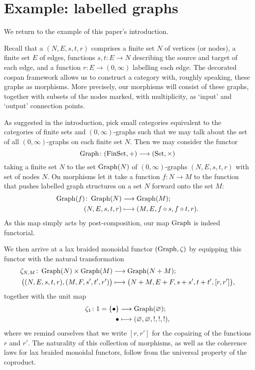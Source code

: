 \section{Example: labelled graphs} \label{sec:ex}

We return to the example of this paper's introduction. 

Recall that a  $(N,E,s,t,r)$ comprises a finite set
$N$ of vertices (or nodes), a finite set $E$ of edges, functions $s,t\colon  E \to N$
describing the source and target of each edge, and a function $r\colon  E \to
(0,\infty)$ labelling each edge. The decorated cospan framework allows us to
construct a category with, roughly speaking, these graphs as morphisms. More
precisely, our morphisms will consist of these graphs, together with subsets of
the nodes marked, with multiplicity, as `input' and `output' connection points.

As suggested in the introduction, pick small categories equivalent to the
categories of finite sets and $(0,\infty)$-graphs such that we may talk about
the set of all $(0,\infty)$-graphs on each finite set $N$.  Then we may consider
the functor
\[
  \operatorname{Graph}\colon  (\mathrm{FinSet},+) \longrightarrow (\mathrm{Set},\times)
\]
taking a finite set $N$ to the set $\operatorname{Graph}(N)$ of $(0,\infty)$-graphs
$(N,E,s,t,r)$ with set of nodes $N$. On
morphisms let it take a function $f\colon N \to M$ to the function that pushes
labelled graph structures on a set $N$ forward onto the set $M$:
\begin{align*}
  \operatorname{Graph}(f)\colon  \operatorname{Graph}(N) &\longrightarrow
  \operatorname{Graph}(M); \\
  (N,E,s,t,r) &\longmapsto (M,E,f \circ s, f \circ t, r).
\end{align*}
As this map simply acts by post-composition, our map $\operatorname{Graph}$ is indeed
functorial.

We then arrive at a lax braided monoidal functor $(\operatorname{Graph},\zeta)$ by equipping
this functor with the natural transformation 
\begin{align*}
  \zeta_{N,M}\colon  \operatorname{Graph}(N) \times \operatorname{Graph}(M)
  &\longrightarrow \operatorname{Graph}(N+M); \\
  \big( (N,E,s,t,r), (M,F,s',t',r') \big) &\longmapsto
  \big(N+M,E+F,s+s',t+t',[r,r']\big),
\end{align*}
together with the unit map
\begin{align*}
  \zeta_1\colon  1=\{\bullet\} &\longrightarrow \operatorname{Graph}(\varnothing); \\
  \bullet &\longmapsto
  (\varnothing,\varnothing,!,!,!),
\end{align*}
where we remind ourselves
that we write $[r,r']$ for the copairing of the functions $r$ and $r'$. The
naturality of this collection of morphisms, as well as the coherence laws for
lax braided monoidal functors, follow from the universal property of the coproduct.

